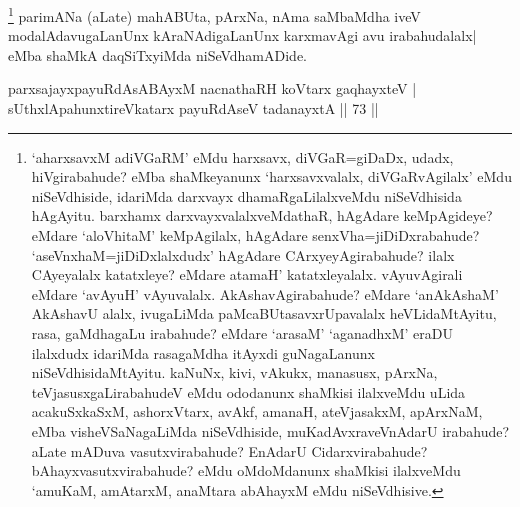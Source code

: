 \begin{artha}
\footnote[1]{`aharxsavxM adiVGaRM' eMdu harxsavx, diVGaR=giDaDx, udadx, hiVgirabahude? eMba shaMkeyanunx `harxsavxvalalx, diVGaRvAgilalx' eMdu niSeVdhiside, idariMda darxvayx dhamaRgaLilalxveMdu niSeVdhisida hAgAyitu. barxhamx darxvayxvalalxveMdathaR, hAgAdare keMpAgideye? eMdare `aloVhitaM' keMpAgilalx, hAgAdare senxVha=jiDiDxrabahude? `aseVnxhaM=jiDiDxlalxdudx' hAgAdare CArxyeyAgirabahude? ilalx CAyeyalalx katatxleye? eMdare atamaH' katatxleyalalx. vAyuvAgirali eMdare `avAyuH' vAyuvalalx. AkAshavAgirabahude? eMdare `anAkAshaM' AkAshavU alalx, ivugaLiMda paMcaBUtasavxrUpavalalx heVLidaMtAyitu, rasa, gaMdhagaLu irabahude? eMdare `arasaM' `aganadhxM' eraDU ilalxdudx idariMda rasagaMdha itAyxdi guNagaLanunx niSeVdhisidaMtAyitu. kaNuNx, kivi, vAkukx, manasusx, pArxNa, teVjasusxgaLirabahudeV eMdu ododanunx shaMkisi ilalxveMdu uLida acakuSxkaSxM, ashorxVtarx, avAkf, amanaH, ateVjasakxM, apArxNaM, eMba visheVSaNagaLiMda niSeVdhiside, muKadAvxraveVnAdarU irabahude? aLate mADuva vasutxvirabahude? EnAdarU Cidarxvirabahude? bAhayxvasutxvirabahude? eMdu oMdoMdanunx shaMkisi ilalxveMdu `amuKaM, amAtarxM, anaMtara abAhayxM eMdu niSeVdhisive.} parimANa (aLate) mahABUta, pArxNa, nAma saMbaMdha iveV modalAdavugaLanUnx kAraNAdigaLanUnx karxmavAgi avu irabahudalalx| eMba shaMkA daqSiTxyiMda niSeVdhamADide.
\end{artha}


\begin{shl}
\footnotemark[1]parxsajayx\footnotemark[2]payuRdAsABAyxM nacnathaRH koV\s tarx gaqhayxteV |\\
sUthxlApahunxtireVkatarx payuRdAseV tadanayxtA \hfill || 73 ||
\end{shl}

